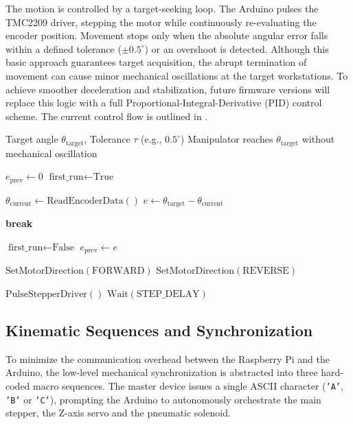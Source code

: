 The motion is controlled by a target-seeking loop. The Arduino pulses the TMC2209 driver, stepping the motor while continuously re-evaluating the encoder position. Movement stops only when the absolute angular error falls within a defined tolerance ($\pm 0.5^\circ$) or an overshoot is detected. Although this basic approach guarantees target acquisition, the abrupt termination of movement can cause minor mechanical oscillations at the target workstations. To achieve smoother deceleration and stabilization, future firmware versions will replace this logic with a full Proportional-Integral-Derivative (PID) control scheme. The current control flow is outlined in .
\begin{algorithm}[htbp]
    \caption{Closed-Loop Stepper Motor Positioning}
    \label{alg:closed_loop}
    \begin{algorithmic}[1]
    \Require Target angle $\theta_{\text{target}}$, Tolerance $\tau$ (e.g., $0.5^\circ$)
    \Ensure Manipulator reaches $\theta_{\text{target}}$ without mechanical oscillation
    
    \State $e_{\text{prev}} \gets 0$
    \State $\text{first\_run} \gets \text{True}$
    
    \Loop
        \State $\theta_{\text{current}} \gets \text{ReadEncoderData}()$ 
        \State $e \gets \theta_{\text{target}} - \theta_{\text{current}}$
        
            \State \textbf{break}
        \EndIf
        
        \State $\text{first\_run} \gets \text{False}$
        \State $e_{\text{prev}} \gets e$
        
            \State $\text{SetMotorDirection}(\text{FORWARD})$
        \Else
            \State $\text{SetMotorDirection}(\text{REVERSE})$
        \EndIf
        
        \State $\text{PulseStepperDriver}()$
        \State $\text{Wait}(\text{STEP\_DELAY})$
    \EndLoop
    \end{algorithmic}
\end{algorithm}

\subsection{Kinematic Sequences and Synchronization}
To minimize the communication overhead between the Raspberry Pi and the Arduino, the low-level mechanical synchronization is abstracted into three hard-coded macro sequences. The master device issues a single ASCII character (\texttt{'A'}, \texttt{'B'} or \texttt{'C'}), prompting the Arduino to autonomously orchestrate the main stepper, the Z-axis servo and the pneumatic solenoid.

